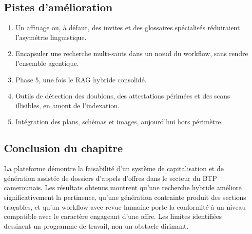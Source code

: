 \subsection{Pistes d'amélioration}

\begin{enumerate}
  \item {} Un affinage ou, à défaut, des
        invites et des glossaires spécialisés réduiraient l'asymétrie
        linguistique.
  \item {} Encapsuler une
        recherche multi-sauts dans un n\oe ud du workflow, sans rendre
        l'ensemble agentique.
  \item {} Phase 5, une fois le RAG hybride
        consolidé.
  \item {} Outils de détection des doublons, des
        attestations périmées et des scans illisibles, en amont de
        l'indexation.
  \item {} Intégration des plans, schémas et images,
        aujourd'hui hors périmètre.
\end{enumerate}

\subsection{Conclusion du chapitre}

La plateforme démontre la faisabilité d'un système de capitalisation et de
génération assistée de dossiers d'appels d'offres dans le secteur du BTP
camerounais. Les résultats obtenus montrent qu'une recherche hybride
améliore significativement la pertinence, qu'une génération contrainte
produit des sections traçables, et qu'un workflow avec revue humaine
porte la conformité à un niveau compatible avec le caractère engageant
d'une offre. Les limites identifiées dessinent un programme de travail,
non un obstacle dirimant.

\btpEndMark
